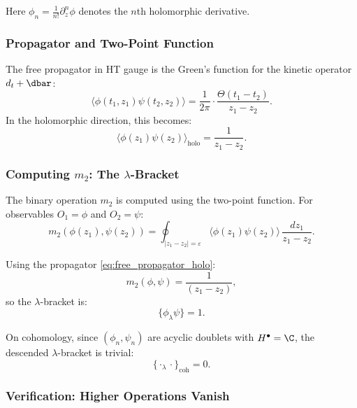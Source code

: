 Here $\phi_n = \frac{1}{n!} \partial_z^n \phi$ denotes the $n$th holomorphic derivative.
\subsubsection{Propagator and Two-Point Function}
The free propagator in HT gauge is the Green's function for the kinetic operator $d_t + \dbar$:
\begin{equation}
\langle \phi(t_1, z_1) \psi(t_2, z_2) \rangle = \frac{1}{2\pi} \cdot \frac{\Theta(t_1 - t_2)}{z_1 - z_2}.
\end{equation}
In the holomorphic direction, this becomes:
\begin{equation}
\langle \phi(z_1) \psi(z_2) \rangle_{\text{holo}} = \frac{1}{z_1 - z_2}.
\end{equation}

\subsubsection{Computing $m_2$: The $\lambda$-Bracket}
The binary operation $m_2$ is computed using the two-point function. For observables $O_1 = \phi$ and $O_2 = \psi$:
\begin{equation}
m_2(\phi(z_1), \psi(z_2)) = \oint_{|z_1 - z_2| = \varepsilon} \langle \phi(z_1) \psi(z_2) \rangle \, \frac{dz_1}{z_1 - z_2}.
\end{equation}

Using the propagator \eqref{eq:free_propagator_holo}:
\begin{equation}
m_2(\phi, \psi) = \frac{1}{(z_1 - z_2)},
\end{equation}
so the $\lambda$-bracket is:
\begin{equation}
\{\phi_\lambda \psi\} = 1.
\end{equation}

On cohomology, since $(\phi_n, \psi_n)$ are acyclic doublets with $H^\bullet = \C$, the descended $\lambda$-bracket is trivial:
\begin{equation}
\{\cdot_\lambda \cdot\}_{\text{coh}} = 0.
\end{equation}

\subsubsection{Verification: Higher Operations Vanish}

